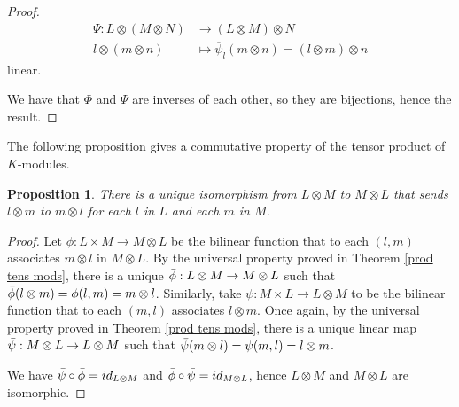 \documentclass{report}
\newtheorem{prop}{Proposition}
\theoremstyle{definition}
\theoremstyle{remark}
\begin{document}
\begin{proof}
\begin{equation*}
    \begin{split}
        \Psi : L \otimes (M \otimes N) & \to (L \otimes M) \otimes N \\
        l \otimes (m \otimes n) & \mapsto \overline{\psi}_l (m \otimes n) = (l \otimes m) \otimes n
    \end{split}
\end{equation*} linear. 

We have that $\Phi$ and $\Psi$ are inverses of each other, so they are bijections, hence the result. 
\end{proof}    

\bigskip
The following proposition gives a commutative property of the tensor product of $K$-modules.

\begin{prop}
    There is a unique isomorphism from $L \otimes M $ to $M \otimes L$ that sends $l \otimes m$ to $m \otimes l$ for each $l$ in $L$ and each $m$ in $M$.
\end{prop}    
    
\begin{proof}
    Let $\phi: L \times M \to M \otimes L$ be the bilinear function that to each $(l,m)$ associates $m \otimes l$ in $M \otimes L$. By the universal property proved in Theorem \ref{prod tens mods}, there is a unique $\Bar{\phi}: L \otimes M \to M \otimes L$ such that $\Bar{\phi}(l \otimes m) = \phi (l,m) = m \otimes l$. Similarly, take $\psi: M \times L \to L \otimes M$ to be the bilinear function that to each $(m,l)$ associates $l \otimes m$. Once again, by the universal property proved in Theorem \ref{prod tens mods}, there is a unique linear map $\Bar{\psi}: M\otimes L \to L \otimes M $ such that $\Bar{\psi}(m \otimes l) = \psi(m,l) = l \otimes m$.
    
    We have $\Bar{\psi}\circ\Bar{\phi} = id_{L\otimes M}$ and $\Bar{\phi}\circ \Bar{\psi} = id_{M \otimes L}$, hence $L \otimes M$ and $M \otimes L$ are isomorphic.
\end{proof}    

\end{document}
